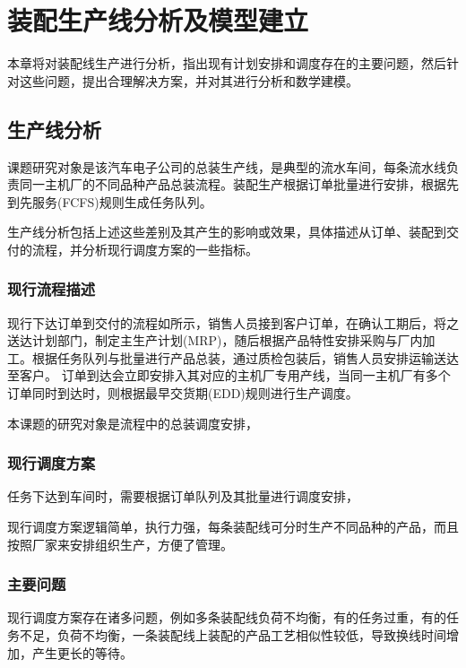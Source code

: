 \chapter{装配生产线分析及模型建立}
本章将对装配线生产进行分析，指出现有计划安排和调度存在的主要问题，然后针对这些问题，提出合理解决方案，并对其进行分析和数学建模。


\section{生产线分析}
课题研究对象是该汽车电子公司的总装生产线，是典型的流水车间，每条流水线负责同一主机厂的不同品种产品总装流程。装配生产根据订单批量进行安排，根据先到先服务(FCFS)规则生成任务队列。

生产线分析包括上述这些差别及其产生的影响或效果，具体描述从订单、装配到交付的流程，并分析现行调度方案的一些指标。

\subsection{现行流程描述}
现行下达订单到交付的流程如所示，销售人员接到客户订单，在确认工期后，将之送达计划部门，制定主生产计划(MRP)，随后根据产品特性安排采购与厂内加工。根据任务队列与批量进行产品总装，通过质检包装后，销售人员安排运输送达至客户。
订单到达会立即安排入其对应的主机厂专用产线，当同一主机厂有多个订单同时到达时，则根据最早交货期(EDD)规则进行生产调度。

本课题的研究对象是流程中的总装调度安排，
\subsection{现行调度方案}
任务下达到车间时，需要根据订单队列及其批量进行调度安排，


现行调度方案逻辑简单，执行力强，每条装配线可分时生产不同品种的产品，而且按照厂家来安排组织生产，方便了管理。


\subsection{主要问题}
现行调度方案存在诸多问题，例如多条装配线负荷不均衡，有的任务过重，有的任务不足，负荷不均衡，一条装配线上装配的产品工艺相似性较低，导致换线时间增加，产生更长的等待。

